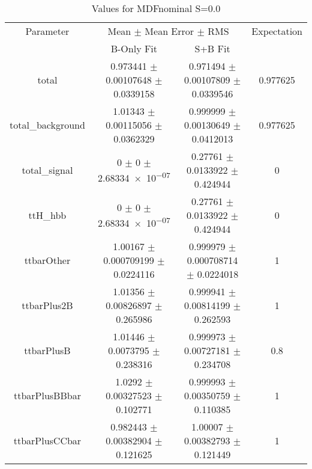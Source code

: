 \begin{table}
\centering
\caption{Values for MDFnominal S=0.0}
\begin{tabular}{cccc}
\toprule
Parameter & \multicolumn{2}{c}{Mean $\pm$ Mean Error $\pm$ RMS} & Expectation\\
 & B-Only Fit & S+B Fit & \\
\midrule
total & \num{0.973441} $\pm$ \num{0.00107648} $\pm$ \num{0.0339158} & \num{0.971494} $\pm$ \num{0.00107809} $\pm$ \num{0.0339546} & \num{0.977625}\\
total\_background & \num{1.01343} $\pm$ \num{0.00115056} $\pm$ \num{0.0362329} & \num{0.999999} $\pm$ \num{0.00130649} $\pm$ \num{0.0412013} & \num{0.977625}\\
total\_signal & \num{0} $\pm$ \num{0} $\pm$ \num{2.68334e-07} & \num{0.27761} $\pm$ \num{0.0133922} $\pm$ \num{0.424944} & \num{0}\\
ttH\_hbb & \num{0} $\pm$ \num{0} $\pm$ \num{2.68334e-07} & \num{0.27761} $\pm$ \num{0.0133922} $\pm$ \num{0.424944} & \num{0}\\
ttbarOther & \num{1.00167} $\pm$ \num{0.000709199} $\pm$ \num{0.0224116} & \num{0.999979} $\pm$ \num{0.000708714} $\pm$ \num{0.0224018} & \num{1}\\
ttbarPlus2B & \num{1.01356} $\pm$ \num{0.00826897} $\pm$ \num{0.265986} & \num{0.999941} $\pm$ \num{0.00814199} $\pm$ \num{0.262593} & \num{1}\\
ttbarPlusB & \num{1.01446} $\pm$ \num{0.0073795} $\pm$ \num{0.238316} & \num{0.999973} $\pm$ \num{0.00727181} $\pm$ \num{0.234708} & \num{0.8}\\
ttbarPlusBBbar & \num{1.0292} $\pm$ \num{0.00327523} $\pm$ \num{0.102771} & \num{0.999993} $\pm$ \num{0.00350759} $\pm$ \num{0.110385} & \num{1}\\
ttbarPlusCCbar & \num{0.982443} $\pm$ \num{0.00382904} $\pm$ \num{0.121625} & \num{1.00007} $\pm$ \num{0.00382793} $\pm$ \num{0.121449} & \num{1}\\
\bottomrule
\end{tabular}
\end{table}